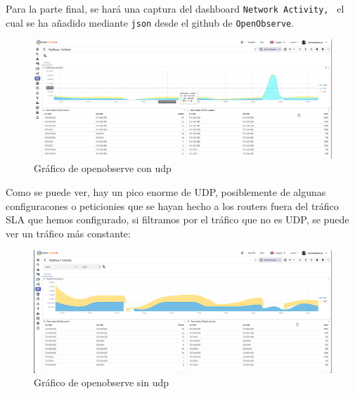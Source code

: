 \documentclass[11pt]{article}
\begin{document}
Para la parte final, se hará una captura del dashboard \texttt{Network Activity, } el cual se ha añadido mediante \texttt{json} desde el github de \texttt{OpenObserve}. 

\begin{figure}[h]
    \centering
    \includegraphics[width=\textwidth]{src/openobs1.png}
    \caption{Gráfico de openobserve con udp}
\end{figure}

Como se puede ver, hay un pico enorme de UDP, posiblemente de algunas configuracones o peticionies que se hayan hecho a los routers fuera del tráfico SLA que hemos configurado, si filtramos por el tráfico que no es UDP, se puede ver un tráfico más constante:

\begin{figure}[h]
    \centering
    \includegraphics[width=\textwidth]{src/openobs2.png}
    \caption{Gráfico de openobserve sin udp}
\end{figure}
\end{document}
